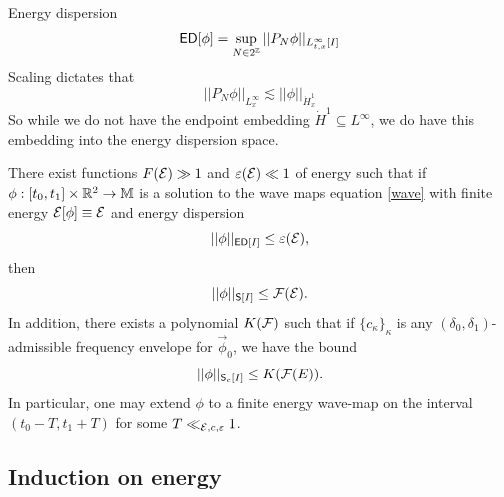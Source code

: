 


Energy dispersion
	\[ \mathsf{ED} [\phi] = \sup_{N \in 2^\mathbb Z} ||P_N \phi||_{L^\infty_{t, x} [I]} \]
Scaling dictates that 
	\[ ||P_N \phi||_{L^\infty_x} \lesssim ||\phi||_{\dot H^1_x} \]	
So while we do not have the endpoint embedding $\dot H^1 \subseteq L^\infty$, we do have this embedding into the energy dispersion space.

\begin{theorem}
	There exist functions $F(\mathcal E) \gg 1$ and $\varepsilon (\mathcal E) \ll 1$ of energy such that if $\phi : [t_0, t_1] \times \mathbb R^2 \to \mathbb M$ is a solution to the wave maps equation \eqref{wave} with finite energy $\mathcal E[\phi] \equiv \mathcal E$ and energy dispersion
		\begin{equation}
			||\phi||_{\mathsf{ED} [I]} \leq \varepsilon (\mathcal E), 
		\label{eq:ED}
		\end{equation}
	then 
		\begin{equation}
			||\phi||_{\mathsf S [I]} \leq \mathcal F(\mathcal E).
		\label{eq:S}
		\end{equation}
	In addition, there exists a polynomial $K(\mathcal F)$ such that if $\{c_\kappa\}_\kappa$ is any $(\delta_0, \delta_1)$-admissible frequency envelope for $\vec \phi_0$, we have the bound 
		\[ ||\phi||_{\mathsf S_c [I]} \leq K(\mathcal F(E)).  \]
	In particular, one may extend $\phi$ to a finite energy wave-map on the interval $(t_0 - T, t_1 + T)$ for some $T \ll_{\mathcal E, c, \varepsilon} 1$. \label{thm:ED}
\end{theorem}

\subsection{Induction on energy}

